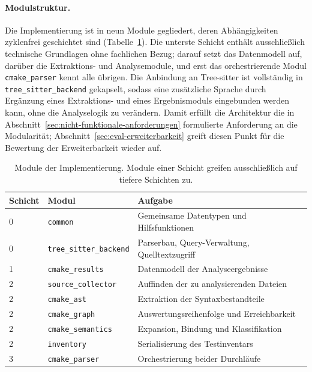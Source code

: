 \documentclass[12pt,a4paper,twoside,headsepline,parskip=half]{scrreprt}
\begin{document}
\paragraph{Modulstruktur.}
Die Implementierung ist in neun Module gegliedert, deren Abhängigkeiten
zyklenfrei geschichtet sind (Tabelle~\ref{tab:impl-module}). Die unterste Schicht
enthält ausschließlich technische Grundlagen ohne fachlichen Bezug; darauf setzt das
Datenmodell auf, darüber die Extraktions- und Analysemodule, und erst das
orchestrierende Modul \texttt{cmake\_parser} kennt alle übrigen. Die Anbindung an
Tree-sitter ist vollständig in \texttt{tree\_sitter\_backend} gekapselt, sodass eine
zusätzliche Sprache durch Ergänzung eines Extraktions- und eines Ergebnismoduls
eingebunden werden kann, ohne die Analyselogik zu verändern. Damit erfüllt die
Architektur die in Abschnitt~\ref{sec:nicht-funktionale-anforderungen} formulierte
Anforderung an die Modularität; Abschnitt~\ref{sec:eval-erweiterbarkeit} greift diesen
Punkt für die Bewertung der Erweiterbarkeit wieder auf.

\begin{table}[H]
    \centering
    \small
    \begin{tabularx}{\textwidth}{l l X}
        \toprule
        \textbf{Schicht} & \textbf{Modul} & \textbf{Aufgabe} \\
        \midrule
        0 & \texttt{common}              & Gemeinsame Datentypen und Hilfsfunktionen \\
        0 & \texttt{tree\_sitter\_backend} & Parserbau, Query-Verwaltung, Quelltextzugriff \\
        1 & \texttt{cmake\_results}      & Datenmodell der Analyseergebnisse \\
        2 & \texttt{source\_collector}   & Auffinden der zu analysierenden Dateien \\
        2 & \texttt{cmake\_ast}          & Extraktion der Syntaxbestandteile \\
        2 & \texttt{cmake\_graph}        & Auswertungsreihenfolge und Erreichbarkeit \\
        2 & \texttt{cmake\_semantics}    & Expansion, Bindung und Klassifikation \\
        2 & \texttt{inventory}           & Serialisierung des Testinventars \\
        3 & \texttt{cmake\_parser}       & Orchestrierung beider Durchläufe \\
        \bottomrule
    \end{tabularx}
    \caption{Module der Implementierung. Module einer Schicht greifen ausschließlich
    auf tiefere Schichten zu.}
    \label{tab:impl-module}
\end{table}
\end{document}

